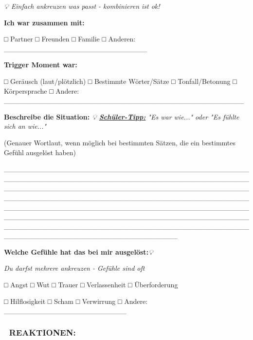 \emph{💡 Einfach ankreuzen was passt - kombinieren ist ok!}

\textbf{Ich war zusammen mit:}

□ Partner □ Freunden □ Familie □ Anderen: \_\_\_\_\_\_\_\_\_\_\_\_\_\_\_\_\_\_\_\_\_\_\_\_\_\_\_\_

\textbf{Trigger Moment war:}

□ Geräusch (laut/plötzlich) □ Bestimmte Wörter/Sätze □ Tonfall/Betonung □ Körpersprache □ Andere: \_\_\_\_\_\_\_\_\_\_\_\_\_\_\_\_\_\_\_\_\_\_\_\_\_\_\_\_\_\_\_\_\_\_\_\_\_\_\_\_\_\_\_\_\_\_\_

\textbf{Beschreibe die Situation:} \emph{💡 \textbf{\ul{Schüler-Tipp:}} "Es war wie..." oder "Es fühlte sich an wie..."}

(Genauer Wortlaut, wenn möglich bei bestimmten Sätzen, die ein bestimmtes Gefühl ausgelöst haben)

\_\_\_\_\_\_\_\_\_\_\_\_\_\_\_\_\_\_\_\_\_\_\_\_\_\_\_\_\_\_\_\_\_\_\_\_\_\_\_\_\_\_\_\_\_\_\_\_\_\_\_\_\_\_\_\_\_\_\_\_\_\_\_\_\_\_\_\_\_\_\_\_\_\_\_\_\_\_\_\_\_\_\_\_\_\_\_\_\_\_\_\_\_\_\_\_\_\_\_\_\_\_\_\_\_\_\_\_\_\_\_\_\_\_\_\_\_\_\_\_\_\_\_\_\_\_\_\_\_\_\_\_\_\_\_\_\_\_\_\_\_\_\_\_\_\_\_\_\_\_\_\_\_\_\_\_\_\_\_\_\_\_\_\_\_\_\_\_\_\_\_\_\_\_\_\_\_\_\_\_\_\_\_\_\_\_\_\_\_\_\_\_\_\_\_\_\_\_\_\_\_\_\_\_\_\_\_\_\_\_\_\_\_\_\_\_\_\_\_\_\_\_\_\_\_\_\_\_\_\_\_\_\_\_\_\_\_\_\_\_\_\_\_\_\_\_\_\_\_\_\_\_\_\_\_\_\_\_\_\_\_\_\_\_\_\_\_\_\_\_\_\_\_\_\_\_\_\_\_\_\_\_\_\_\_\_\_\_\_\_\_\_\_\_\_\_\_\_\_\_\_\_\_\_\_\_\_\_\_\_\_\_\_\_\_\_\_\_\_\_\_\_\_\_\_\_\_\_\_\_\_\_\_\_\_\_\_\_\_\_\_\_\_\_\_\_\_\_\_\_\_\_\_\_\_\_\_\_\_\_\_\_\_\_\_\_\_\_\_\_

\textbf{Welche Gefühle hat das bei mir ausgelöst:}\emph{💡}

\emph{Du darfst mehrere ankreuzen - Gefühle sind oft}

□ Angst □ Wut □ Trauer □ Verlassenheit □ Überforderung

□ Hilflosigkeit □ Scham □ Verwirrung □ Andere: \_\_\_\_\_\_\_\_\_\_\_\_\_\_\_\_\_\_\_\_\_\_\_\_

\hypertarget{section-3}{%
\subsubsection{}\label{section-3}}

\hypertarget{reaktionen}{%
\subsubsection{\texorpdfstring{\textbf{🔄 REAKTIONEN:}}{🔄 REAKTIONEN:}}\label{reaktionen}}

